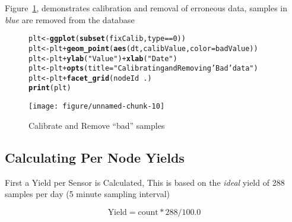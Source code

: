 \documentclass[10pt,a4paper]{article}\usepackage{graphicx, color}
\makeatletter
\def\maxwidth{ %
  \ifdim\Gin@nat@width>\linewidth
    \linewidth
  \else
    \Gin@nat@width
  \fi
}
\newcommand{\hlfunctioncall}[1]{\textcolor[rgb]{0.501960784313725,0,0.329411764705882}{\textbf{#1}}}%
\newcommand{\hlstring}[1]{\textcolor[rgb]{0.6,0.6,1}{#1}}%
\newenvironment{kframe}{%
 \def\at@end@of@kframe{}%
 \ifinner\ifhmode%
  \def\at@end@of@kframe{\end{minipage}}%
  \begin{minipage}{\columnwidth}%
 \fi\fi%
 \def\FrameCommand##1{\hskip\@totalleftmargin \hskip-\fboxsep
 \colorbox{shadecolor}{##1}\hskip-\fboxsep
     \hskip-\linewidth \hskip-\@totalleftmargin \hskip\columnwidth}%
 \MakeFramed {\advance\hsize-\width
   \@totalleftmargin\z@ \linewidth\hsize
   \@setminipage}}%
 {\par\unskip\endMakeFramed%
 \at@end@of@kframe}
\newenvironment{knitrout}{}{} %
\makeatother
\begin{document}
Figure~\ref{fig:remove-calib-data}, demonstrates calibration and removal of
erroneous data,  samples in \emph{blue} are removed from the database

\begin{figure}
\begin{knitrout}
\color{fgcolor}\begin{kframe}
\begin{alltt}
plt <- \hlfunctioncall{ggplot}(\hlfunctioncall{subset}(fixCalib, type == 0))
plt <- plt + \hlfunctioncall{geom_point}(\hlfunctioncall{aes}(dt, calibValue, color = badValue))
plt <- plt + \hlfunctioncall{ylab}(\hlstring{"Value"}) + \hlfunctioncall{xlab}(\hlstring{"Date"})
plt <- plt + \hlfunctioncall{opts}(title = \hlstring{"Calibrating and Removing \hlstring{'Bad'} data"})
plt <- plt + \hlfunctioncall{facet_grid}(nodeId ~ .)
\hlfunctioncall{print}(plt)
\end{alltt}
\end{kframe}
\texttt{[image: figure/unnamed-chunk-10]} 

\end{knitrout}

\caption{Calibrate and Remove ``bad'' samples}
\label{fig:remove-calib-data}
\end{figure}

\subsection{Calculating Per Node Yields}

First a Yield per Sensor is Calculated, This is based on the \emph{ideal} yield
of 288 samples per day (5 minute sampling interval)

\begin{equation}
  \text{Yield} = \text{count} * 288 / 100.0
  \label{eq:calc-yield}
\end{equation}
\end{document}
